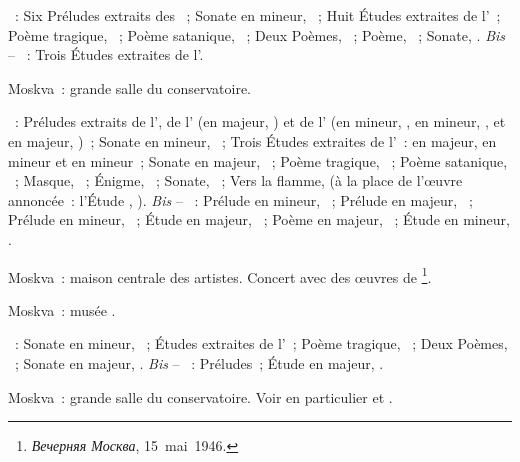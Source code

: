 \begin{description}
 \textsc{\Scriabine{}}~: Six Préludes extraits des ~;
 Sonate en \kF \Sharp mineur, ~; Huit Études extraites de
 l'~; Poème tragique, ~; Poème satanique, ~; Deux
 Poèmes, ~; Poème,  ~; Sonate, .
 \emph{Bis} -- \textsc{\Scriabine{}}~: Trois Études extraites de l'.
 \item[\DateWithWeekDay{1946-05-15}]
 Moskva~: grande salle du conservatoire.

 \textsc{\Scriabine{}}~: Préludes extraits de l', de l'
 (en \kF \Sharp majeur, ) et de l' (en \kF mineur,
 , en \kB \Flat mineur, , et en \kD \Flat majeur,
 )~; Sonate en \kF \Sharp mineur, ~; Trois Études
 extraites de l'~:  en \kB majeur,  en \kB \Flat
 mineur et  en \kG \Sharp mineur~; Sonate en \kF \Sharp majeur,
 ~; Poème tragique, ~; Poème satanique, ~;
 Masque,  ~; Énigme,  ~; Sonate,
 ~; Vers la flamme,  (à la place de l'œuvre annoncée~:
 l'\hbox{Étude} ,  ).
 \emph{Bis} -- \textsc{\Scriabine{}}~: Prélude en \kG mineur, 
 ~; Prélude en \kE \Flat majeur,  ~; Prélude
 en \kE \Flat mineur,  ~; Étude en \kD \Flat majeur,
  ~; Poème en \kF \Sharp majeur,  ~;
 Étude en \kD \Sharp mineur,  .
 \item[\DateWithWeekDay{1946-05-17}]
 Moskva~: maison centrale des artistes.
 Concert avec des œuvres de \Scriabine{}%
 \footnote{\foreignlanguage{russian}{\emph{Вечерняя Москва}}, 15~mai~1946.}.
 \item[\DateWithWeekDay{1946-05-19}]
 Moskva~: musée \Scriabine{}.

 \textsc{\Scriabine{}}~: Sonate en \kF \Sharp mineur, ~; Études
 extraites de l'~; Poème tragique, ~; Deux Poèmes,
 ~; Sonate en \kF \Sharp majeur, .
 \emph{Bis} -- \textsc{\Scriabine{}}~: Préludes~; Étude en \kD \Flat majeur,
  .
 \item[\DateWithWeekDay{1946-05-23}]
 Moskva~: grande salle du conservatoire.
 Voir en particulier \citet[p.~442]{Milshteyn82a} et
 \citet[p.~394]{Nikonovich08}.


\end{description}
